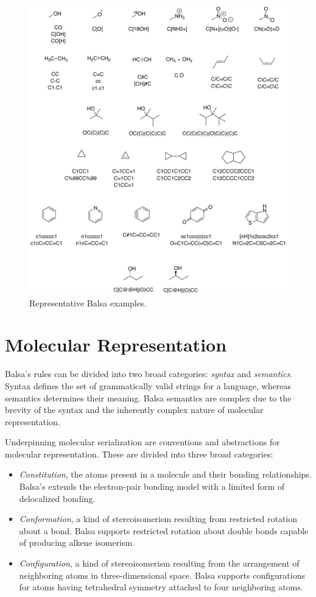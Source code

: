 \documentclass{article}
\begin{document}
\begin{figure}
\centering
\includegraphics[width=\columnwidth]{representative-examples.pdf}
\caption{Representative Balsa examples.}
\label{fig:representative-examples}
\end{figure}

\section*{Molecular Representation}
\label{molecular-representation}

Balsa's rules can be divided into two broad categories: \textit{syntax} and \textit{semantics}. Syntax defines the set of grammatically valid strings for a language, whereas semantics determines their meaning. Balsa semantics are complex due to the brevity of the syntax and the inherently complex nature of molecular representation.

Underpinning molecular serialization are conventions and abstractions for molecular representation. These are divided into three broad categories:

\begin{itemize}
\item \textit{Constitution}, the atoms present in a molecule and their bonding relationships. Balsa's extends the electron-pair bonding model with a limited form of delocalized bonding.
\item \textit{Conformation}, a kind of stereoisomerism resulting from restricted rotation about a bond. Balsa supports restricted rotation about double bonds capable of producing alkene isomerism.
\item \textit{Configuration}, a kind of stereoisomerism resulting from the arrangement of neighboring atoms in three-dimensional space. Balsa supports configurations for atoms having tetrahedral symmetry attached to four neighboring atoms.
\end{itemize}
\end{document}

